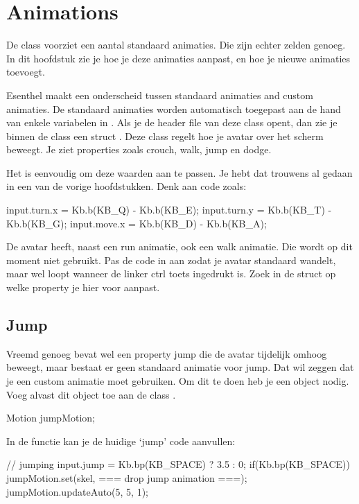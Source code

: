 \chapter{Animations}
De class  voorziet een aantal standaard animaties. Die zijn echter zelden genoeg. In dit hoofdstuk zie je hoe je deze animaties aanpast, en hoe je nieuwe animaties toevoegt.

Esenthel maakt een onderscheid tussen standaard animaties and custom animaties. De standaard animaties worden automatisch toegepast aan de hand van enkele variabelen in . Als je de header file van deze class opent, dan zie je binnen de class een struct . Deze class regelt hoe je avatar over het scherm beweegt. Je ziet properties zoals crouch, walk, jump en dodge.

Het is eenvoudig om deze waarden aan te passen. Je hebt dat trouwens al gedaan in een van de vorige hoofdstukken. Denk aan code zoals:

\begin{code}
input.turn.x = Kb.b(KB_Q) - Kb.b(KB_E);
input.turn.y = Kb.b(KB_T) - Kb.b(KB_G);
input.move.x = Kb.b(KB_D) - Kb.b(KB_A);
\end{code}

\begin{exercise}
De avatar heeft, naast een run animatie, ook een walk animatie. Die wordt op dit moment niet gebruikt. Pas de code in  aan zodat je avatar standaard wandelt, maar wel loopt wanneer de linker ctrl toets ingedrukt is. Zoek in de struct  op welke property je hier voor aanpast.
\end{exercise}

\section{Jump}
Vreemd genoeg bevat  wel een property jump die de avatar tijdelijk omhoog beweegt, maar bestaat er geen standaard animatie voor jump. Dat wil zeggen dat je een custom animatie moet gebruiken. Om dit te doen heb je een  object nodig. Voeg alvast dit object toe aan de class .

\begin{code}
Motion jumpMotion;
\end{code}

In de functie  kan je de huidige `jump' code aanvullen:

\begin{code}
// jumping
input.jump = Kb.bp(KB_SPACE) ?  3.5 :  0;
if(Kb.bp(KB_SPACE))
{
  jumpMotion.set(skel, === drop jump animation ===);
}
jumpMotion.updateAuto(5, 5, 1);
\end{code}

